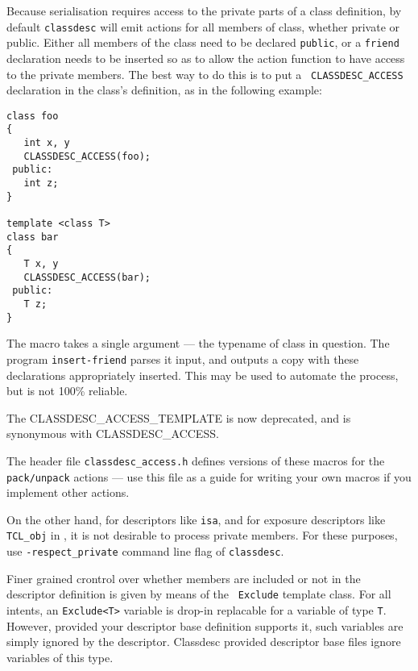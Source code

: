 \label{CLASSDESC ACCESS}

Because serialisation requires access to the private parts of a class
definition, by default {\tt classdesc} will emit actions for all members of
class, whether private or public. Either all members of the class need
to be declared {\tt public}, or a {\tt friend} declaration needs to be
inserted so as to allow the action function to have access to the
private members. The best way to do this is to put a {\tt
CLASSDESC\_ACCESS} declaration in the class's definition, as in the
following example:
\begin{verbatim}
class foo
{
   int x, y
   CLASSDESC_ACCESS(foo);
 public:
   int z;
}

template <class T>
class bar
{
   T x, y
   CLASSDESC_ACCESS(bar);
 public:
   T z;
}
\end{verbatim}

The macro takes a single argument --- the typename of class in
question. The program {\tt insert-friend} parses
it input, and outputs a copy with these declarations appropriately
inserted. This may be used to automate the process, but is not 100\% reliable.

The CLASSDESC\_ACCESS\_TEMPLATE is now deprecated, and is synonymous
with CLASSDESC\_ACCESS.

The header file \verb+classdesc_access.h+
defines versions of these macros for the {\tt pack/unpack} actions ---
use this file as a guide for writing your own macros if you implement
other actions.

On the other hand, for descriptors like \verb+isa+, and for exposure
descriptors like \verb+TCL_obj+ in \EcoLab{}, it is not desirable to
process private members. For these purposes, use
\verb+-respect_private+ command line flag of \verb+classdesc+.


Finer grained crontrol over whether members are included or not in the
descriptor definition is given by means of the {\tt
  Exclude} template class. For all intents, an
\verb+Exclude<T>+ variable is drop-in replacable for a variable of
type {\tt T}. However, provided your descriptor base definition
supports it, such variables are simply ignored by the
descriptor. Classdesc provided descriptor base files ignore variables
of this type.


